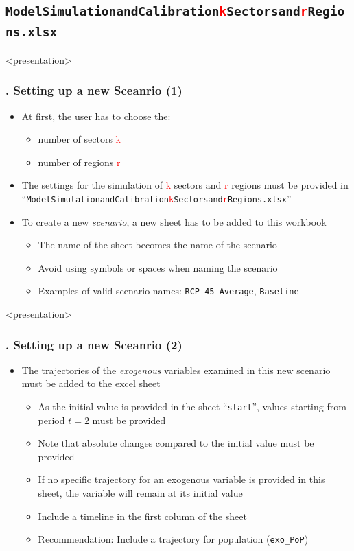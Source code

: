 \documentclass[11pt,aspectratio=169]{beamer}
\begin{document}
\subsection{\texttt{ModelSimulationandCalibration\textcolor{red}{k}Sectorsand\textcolor{red}{r}Regions.xlsx}}

\begin{frame}<presentation>
\frametitle{{\thesection.\thesubsection} Setting up a new Sceanrio (1)}
	\begin{itemize}
			\item At first, the user has to choose the:
				\begin{itemize}
					\item number of sectors \textcolor{red}{k}
					\item number of regions \textcolor{red}{r}
				\end{itemize}
			\item The settings for the simulation of \textcolor{red}{k} sectors and \textcolor{red}{r} regions must be provided in ``\texttt{ModelSimulationandCalibration\textcolor{red}{k}Sectorsand\textcolor{red}{r}Regions.xlsx}''
			\item To create a new \textit{scenario}, a new sheet has to be added to this workbook
			\begin{itemize}
				\item The name of the sheet becomes the name of the scenario
				\item Avoid using symbols or spaces when naming the scenario
				\item Examples of valid scenario names: \texttt{RCP\_45\_Average}, \texttt{Baseline}
			\end{itemize}
	\end{itemize}
\end{frame}
\begin{frame}<presentation>
	\frametitle{{\thesection.\thesubsection} Setting up a new Sceanrio (2)}
	\begin{itemize}
		\item The trajectories of the \textit{exogenous} variables examined in this new scenario must be added to the excel sheet
		\begin{itemize}
			\item As the initial value is provided in the sheet ``\texttt{start}'', values starting from period $t=2$ must be provided
			\item Note that absolute changes compared to the initial value must be provided
			\item If no specific trajectory for an exogenous variable is provided in this sheet, the variable will remain at its initial value 
			\item Include a timeline in the first column of the sheet
			\item Recommendation: Include a trajectory for population (\texttt{exo\_PoP})
		\end{itemize}
	\end{itemize}
\end{frame}
\end{document}
